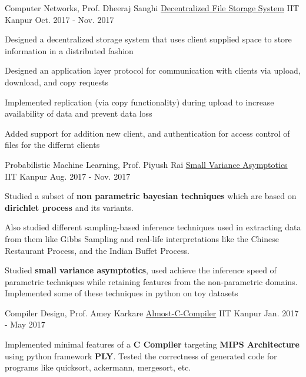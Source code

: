 \begin{cventries}
  \cventry
    {Computer Networks, Prof. Dheeraj Sanghi}
    {\href{https://bitbucket.org/arhamchopra11/decentralized_file_storage}{Decentralized File Storage System}}
    {IIT Kanpur}
    {Oct. 2017 - Nov. 2017}
    {
      \begin{cvitems}
        \item {Designed a decentralized storage system that uses client supplied space to store information in a distributed fashion}
        \item {Designed an application layer protocol for communication with clients via upload, download, and copy requests}
        \item {Implemented replication (via copy functionality) during upload to increase availability of data and prevent data loss}
        \item {Added support for addition new client, and authentication for access control of files for the differnt clients}
      \end{cvitems}
    }
  \cventry
    {Probabilistic Machine Learning, Prof. Piyush Rai}
    {\href{https://bitbucket.org/arhamchopra11/non-parametric-bayesian}{Small Variance Asymptotics}}
    {IIT Kanpur}
    {Aug. 2017 - Nov. 2017}
    {
      \begin{cvitems}
        \item {Studied a subset of \textbf{non parametric bayesian techniques} which are based on \textbf{dirichlet process} and its variants.}
        \item {Also studied different sampling-based inference techniques used in extracting data from them like Gibbs Sampling and real-life interpretations like the Chinese Restaurant Process, and the Indian Buffet Process.}
        \item {Studied \textbf{small variance asymptotics}, used achieve the inference speed of parametric techniques while retaining features from the non-parametric domains. Implemented some of these techniques in python on toy datasets}
      \end{cvitems}
    }
  \cventry
    {Compiler Design, Prof. Amey Karkare}
    {\href{https://bitbucket.org/arhamchopra11/almost-c-compiler}{Almost-C-Compiler}}
    {IIT Kanpur}
    {Jan. 2017 - May 2017}
    {
      \begin{cvitems}
        \item {Implemented minimal features of a \textbf{C Compiler} targeting \textbf{MIPS Architecture} using python framework \textbf{PLY}. Tested the correctness of generated code for programs like quicksort, ackermann, mergesort, etc.}

\end{cvitems}}
\end{cventries}
